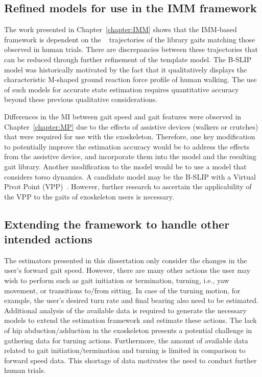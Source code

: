 \subsection{Refined models for use in the IMM framework}
The work presented in Chapter~\ref{chapter:IMM} shows that the IMM-based framework is dependent on the \com~ trajectories of the library gaits matching those observed in human trials. There are discrepancies between these trajectories that can be reduced through further refinement of the template model. %
The B-SLIP model was historically motivated by the fact that it qualitatively displays the characteristic M-shaped ground reaction force profile of human walking. The use of such models for accurate state estimation requires quantitative accuracy beyond these previous qualitative considerations. 

Differences in the MI between gait speed and gait features were observed in Chapter~\ref{chapter:MP} due to the effects of assistive devices (walkers or crutches) that were required for use with the exoskeleton. Therefore, one key modification to potentially improve the estimation accuracy would be to address the effects from the assistive device, and incorporate them into the model and the resulting gait library. Another modification to the model would be to use a model that considers torso dynamics. A candidate model may be the B-SLIP with a Virtual Pivot Point (VPP)~\cite{maus2010upright}. However, further research to ascertain the applicability of the VPP to the gaits of exoskeleton users is necessary. 

\subsection{Extending the framework to handle other intended actions}

The estimators presented in this dissertation only consider the changes in the user's forward gait speed. However, there are many other actions the user may wish to perform such as gait initiation or termination, turning, i.e., yaw movement, or transitions to/from sitting. In case of the turning motion, for example, the user's desired turn rate and final bearing also need to be estimated. Additional analysis of the available data is required to generate the necessary models to extend the estimation framework and estimate these actions. The lack of hip abduction/adduction in the exoskeleton presents a potential challenge in gathering data for turning actions. Furthermore, the amount of available data related to gait initiation/termination and turning is limited in comparison to forward speed data. This shortage of data motivates the need to conduct further human trials.

